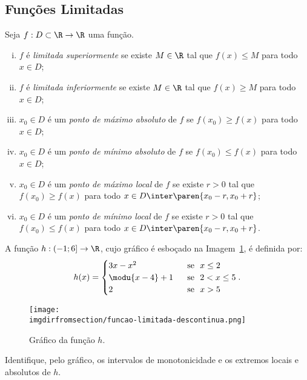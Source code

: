 \subsection{Funções Limitadas}

\begin{definition}
	Seja $f: D \subset \R \to \R$ uma função.
\begin{enumerate}[(i)]
  \item $f$ é \emph{limitada superiormente} se existe $M \in \R$ tal
  que $f(x) \leq M$ para todo $x \in D$;
  \item $f$ é \emph{limitada inferiormente} se existe $M \in \R$ tal
  que $f(x) \geq M$ para todo $x \in D$;
  \item $x_0 \in D$ é um \emph{ponto de máximo absoluto} de $f$ se
  $f(x_0) \geq f(x)$ para todo $x \in D$;
  \item $x_0 \in D$ é um \emph{ponto de mínimo absoluto} de $f$ se
  $f(x_0) \leq f(x)$ para todo $x \in D$;
  \item $x_0 \in D$ é um \emph{ponto de máximo local} de $f$ se
  existe $r>0$ tal que $f(x_0) \geq f(x)$ para todo $x \in D \inter \paren{x_0 - r , x_0+r}$;
  \item $x_0 \in D$ é um \emph{ponto de mínimo local} de $f$ se
  existe $r>0$ tal que $f(x_0) \leq f(x)$ para todo $x \in D \inter \paren{x_0 - r ,
  x_0+r}$.
\end{enumerate}
\end{definition}

\begin{example}
	A função $h : \left( -1 ; 6 \right] \to \R$, cujo gráfico é esboçado
na Imagem~\ref{img:funcao-limitada-descontinua}, é definida por:
%
$$h(x) = \begin{cases}
								3x-x^2 & \ \text{ se } \ x\leq 2 \\
								\modu{x-4} +1 & \ \text{ se } \ 2 < x \leq 5 \\
								2 & \ \text{ se } \ x > 5 \\
								\end{cases}.$$
%
\begin{figure}[H]
	\centering
	\texttt{[image: \\imgdirfromsection/funcao-limitada-descontinua.png]}
	\caption{Gráfico da função $h$.}
	\label{img:funcao-limitada-descontinua}
\end{figure}
%
Identifique, pelo gráfico, os intervalos de monotonicidade e os extremos locais e absolutos de $h$.
\end{example}

